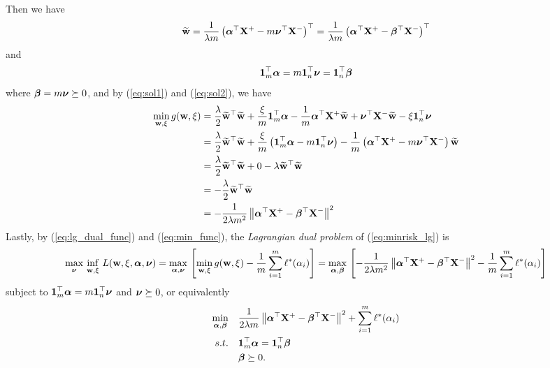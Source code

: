Then we have
\begin{equation}
\label{eq:sol1}
\widetilde{\mathbf{w}} 
= \frac{1}{\lambda m} \left( \bm{\alpha}^\top \mathbf{X}^+ - m \bm{\nu}^\top \mathbf{X}^- \right)^\top 
= \frac{1}{\lambda m} \left( \bm{\alpha}^\top \mathbf{X}^+ - \bm{\beta}^\top \mathbf{X}^- \right)^\top  
\end{equation}
and
\begin{equation}
\label{eq:sol2}
\mathbf{1}_m^\top \bm{\alpha} = m \mathbf{1}_n^\top \bm{\nu} = \mathbf{1}_n^\top \bm{\beta}
\end{equation}
where $\bm{\beta} = m \bm{\nu} \succeq 0$, and by (\ref{eq:sol1}) and (\ref{eq:sol2}), we have
\begin{equation}
\label{eq:min_func}
\begin{aligned}
\min_{\mathbf{w}, \xi} g(\mathbf{w}, \xi) 
&= \frac{\lambda}{2} \widetilde{\mathbf{w}}^\top \widetilde{\mathbf{w}} + \frac{\xi}{m} \mathbf{1}_m^\top \bm{\alpha} -
   \frac{1}{m} \bm{\alpha}^\top \mathbf{X}^+ \widetilde{\mathbf{w}} + \bm{\nu}^\top \mathbf{X}^- \widetilde{\mathbf{w}} - \xi \mathbf{1}_n^\top \bm{\nu} \\
&= \frac{\lambda}{2} \widetilde{\mathbf{w}}^\top \widetilde{\mathbf{w}} + 
   \frac{\xi}{m} \left( \mathbf{1}_m^\top \bm{\alpha} - m \mathbf{1}_n^\top \bm{\nu} \right) - 
   \frac{1}{m} \left( \bm{\alpha}^\top \mathbf{X}^+ - m \bm{\nu}^\top \mathbf{X}^- \right) \widetilde{\mathbf{w}} \\
&= \frac{\lambda}{2} \widetilde{\mathbf{w}}^\top \widetilde{\mathbf{w}} + 0 - \lambda \widetilde{\mathbf{w}}^\top \widetilde{\mathbf{w}} \\
&= -\frac{\lambda}{2} \widetilde{\mathbf{w}}^\top \widetilde{\mathbf{w}} \\
&= -\frac{1}{2 \lambda m^2} \left\| \bm{\alpha}^\top \mathbf{X}^+ - \bm{\beta}^\top \mathbf{X}^- \right\|^2
\end{aligned}
\end{equation}
Lastly, by (\ref{eq:lg_dual_func}) and (\ref{eq:min_func}), the \emph{Lagrangian dual problem} of (\ref{eq:minrisk_lg}) is
\begin{align*}
\max_{\bm{\nu}} \, \inf_{\mathbf{w}, \xi} \, L(\mathbf{w}, \xi, \bm{\alpha}, \bm{\nu}) 
= \max_{\bm{\alpha}, \bm{\nu}} \, \left[ \min_{\mathbf{w}, \xi} g(\mathbf{w}, \xi) - \frac{1}{m} \sum_{i=1}^m \ell^*(\alpha_i) \right]
= \max_{\bm{\alpha}, \bm{\beta}} \, \left[ -\frac{1}{2 \lambda m^2} \left\| \bm{\alpha}^\top \mathbf{X}^+ - \bm{\beta}^\top \mathbf{X}^- \right\|^2 - 
  \frac{1}{m} \sum_{i=1}^m \ell^*(\alpha_i) \right]
\end{align*}
subject to $\mathbf{1}_m^\top \bm{\alpha} = m \mathbf{1}_n^\top \bm{\nu}$ and $\bm{\nu} \succeq 0$,
or equivalently 
\begin{equation}
\label{eq:minrisk_dual}
\begin{aligned}
\min_{\bm{\alpha}, \bm{\beta}} \quad & \frac{1}{2 \lambda m} \left\| \bm{\alpha}^\top \mathbf{X}^+ - \bm{\beta}^\top \mathbf{X}^- \right\|^2 + \sum_{i=1}^m \ell^*(\alpha_i) \\
s.t. \quad & \mathbf{1}_m^\top \bm{\alpha} = \mathbf{1}_n^\top \bm{\beta} \\
& \bm{\beta} \succeq 0.
\end{aligned}
\end{equation}


